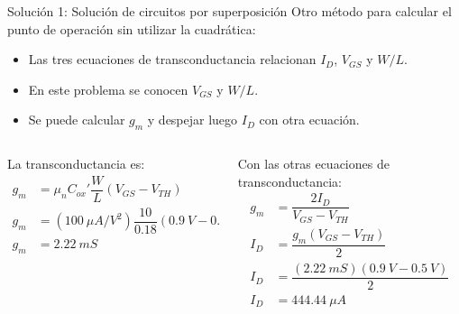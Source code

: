 \documentclass[t,aspectratio=169]{beamer}
\begin{document}
\begin{frame}{Solución 1: Solución de circuitos por superposición}
Otro método para calcular el punto de operación sin utilizar la cuadrática:

\begin{itemize}
    \item Las tres ecuaciones de transconductancia relacionan $I_D$, $V_{GS}$ y $W/L$.
    \item En este problema se conocen $V_{GS}$ y $W/L$.
    \item Se puede calcular $g_m$ y despejar luego $I_D$ con otra ecuación.
\end{itemize}

\begin{columns}

\begin{column}{0.5\textwidth}

La transconductancia es:
\begin{align*}
 g_m &= \mu_n C_{ox}' \dfrac{W}{L} (V_{GS} - V_{TH}) \\
 g_m &= (100\ \mu A/V^2) \dfrac{10}{0.18} (0.9\ V - 0.5\ V) \\
 g_m &= 2.22\ mS 
\end{align*}

\end{column}

\begin{column}{0.5\textwidth}

Con las otras ecuaciones de transconductancia:
\begin{align*}
g_m &= \dfrac{2I_D}{V_{GS} - V_{TH}} \\
I_D &= \dfrac{g_m(V_{GS} - V_{TH})}{2} \\
I_D &= \dfrac{(2.22\ mS)(0.9\ V-0.5\ V)}{2} \\
I_D &= 444.44\ \mu A
\end{align*}

\end{column}

\end{columns}

\end{frame}
\end{document}
